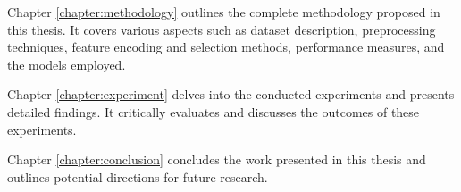 \medskip
Chapter \ref{chapter:methodology} outlines the complete methodology proposed in this thesis. It covers various aspects such as dataset description, preprocessing techniques, feature encoding and selection methods, performance measures, and the models employed.

\medskip
Chapter \ref{chapter:experiment} delves into the conducted experiments and presents detailed findings. It critically evaluates and discusses the outcomes of these experiments.

\medskip
Chapter \ref{chapter:conclusion} concludes the work presented in this thesis and outlines potential directions for future research.

